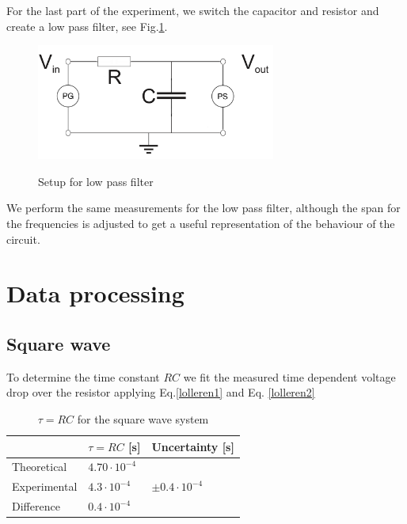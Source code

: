 \documentclass[../main/main.tex]{subfiles}
\begin{document}
For the last part of the experiment, we switch the capacitor and resistor and create a low pass filter, see Fig.\ref{fig:setup2}.

\begin{figure}[!ht]
  \centering
    \includegraphics[width=0.7\textwidth]{../img/setup2.png}
    \label{fig:setup2}
    \caption{Setup for low pass filter}
\end{figure}

We perform the same measurements for the low pass filter, although the span for the frequencies is adjusted to get a useful representation of the behaviour of the circuit.

\section{Data processing}

\subsection*{Square wave}

To determine the time constant \( RC \) we fit the measured time dependent voltage drop over the resistor applying Eq.\ref{lolleren1} and Eq. \ref{lolleren2}

\begin{table}[]
\centering
\caption{\( \tau = RC \) for the square wave system}
\label{data_square}
\begin{tabular}{|l|l|l|}
\hline
             & \( \tau = RC\) [s]       & Uncertainty [s]                         \\ \hline
Theoretical  & \( 4.70 \cdot 10^{-4} \) &                                         \\ \hline
Experimental & \( 4.3 \cdot 10^{-4} \)  & \( \pm 0.4 \cdot 10^{-4} \)             \\ \hline
Difference   & \( 0.4 \cdot 10^{-4} \)  &                                         \\ \hline
\end{tabular}
\end{table}
\end{document}
